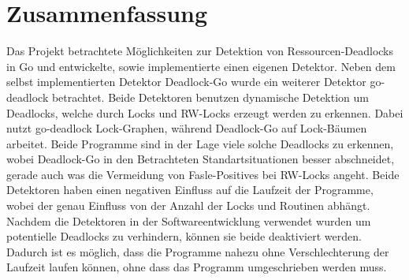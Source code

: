 \chapter{Zusammenfassung}
Das Projekt betrachtete Möglichkeiten zur Detektion von Ressourcen-Deadlocks
in Go und entwickelte, sowie implementierte einen eigenen Detektor. Neben dem 
selbst implementierten Detektor Deadlock-Go wurde ein weiterer Detektor go-deadlock
betrachtet. Beide Detektoren benutzen dynamische Detektion um Deadlocks, welche 
durch Locks und RW-Locks erzeugt werden zu erkennen. Dabei nutzt go-deadlock 
Lock-Graphen, während Deadlock-Go auf Lock-Bäumen arbeitet. Beide Programme sind 
in der Lage viele solche Deadlocks zu erkennen, wobei Deadlock-Go in den 
Betrachteten Standartsituationen besser abschneidet, gerade auch was die
Vermeidung von Fasle-Positives bei RW-Locks angeht. Beide Detektoren 
haben einen negativen Einfluss auf die Laufzeit der Programme, wobei der 
genau Einfluss von der Anzahl der Locks und Routinen abhängt.
Nachdem die Detektoren in der Softwareentwicklung verwendet wurden um potentielle 
Deadlocks zu verhindern, können sie beide deaktiviert werden. Dadurch ist es 
möglich, dass die Programme nahezu ohne Verschlechterung der Laufzeit laufen 
können, ohne dass das Programm umgeschrieben werden muss.